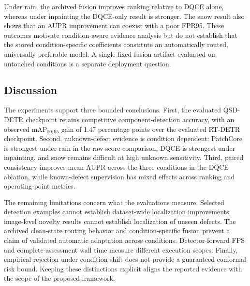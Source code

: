 Under rain, the archived fusion improves ranking relative to DQCE alone,
whereas under inpainting the DQCE-only result is stronger. The snow result
also shows that an AUPR improvement can coexist with a poor FPR95. These
outcomes motivate condition-aware evidence analysis but do not establish
that the stored condition-specific coefficients constitute an automatically
routed, universally preferable model. A single fixed fusion artifact
evaluated on untouched conditions is a separate deployment question.

\subsection{Discussion}
\label{subsec:experimental_discussion}

The experiments support three bounded conclusions. First, the evaluated
QSD-DETR checkpoint retains competitive component-detection accuracy, with
an observed mAP$_{50:95}$ gain of 1.47 percentage points over the evaluated
RT-DETR checkpoint. Second, unknown-defect evidence is condition dependent:
PatchCore is strongest under rain in the raw-score comparison, DQCE is
strongest under inpainting, and snow remains difficult at high unknown
sensitivity. Third, paired consistency improves mean AUPR across the three
conditions in the DQCE ablation, while known-defect supervision has mixed
effects across ranking and operating-point metrics.

The remaining limitations concern what the evaluations measure. Selected
detection examples cannot establish dataset-wide localization improvements;
image-level novelty results cannot establish localization of unseen defects.
The archived clean-state routing behavior and condition-specific fusion
prevent a claim of validated automatic adaptation across conditions.
Detector-forward FPS and complete-assessment wall time measure different
execution scopes. Finally, empirical rejection under condition shift does
not provide a guaranteed conformal risk bound. Keeping these distinctions
explicit aligns the reported evidence with the scope of the proposed
framework.

